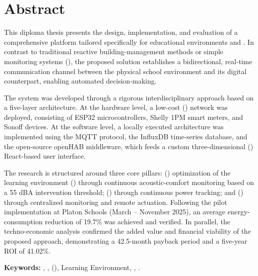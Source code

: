 \clearpage
{}
\chapter*{Abstract}

This diploma thesis presents the design, implementation, and evaluation of a comprehensive  platform tailored specifically for educational environments and . In contrast to traditional reactive building-management methods or simple monitoring systems (), the proposed solution establishes a bidirectional, real-time communication channel between the physical school environment and its digital counterpart, enabling automated decision-making.

The system was developed through a rigorous interdisciplinary approach based on a five-layer architecture. At the hardware level, a low-cost  () network was deployed, consisting of ESP32 microcontrollers, Shelly 1PM smart meters, and Sonoff devices. At the software level, a locally executed architecture was implemented using the MQTT protocol, the InfluxDB time-series database, and the open-source openHAB middleware, which feeds a custom three-dimensional () React-based user interface.

The research is structured around three core pillars: () optimization of the learning environment () through continuous acoustic-comfort monitoring based on a 55 dBA intervention threshold; ()  through continuous power tracking; and ()  through centralized monitoring and remote actuation. Following the pilot implementation at Platon Schools (March -- November 2025), an average energy-consumption reduction of 19.7\% was achieved and verified. In parallel, the techno-economic analysis confirmed the added value and financial viability of the proposed approach, demonstrating a 42.5-month payback period and a five-year ROI of 41.02\%.

\noindent\textbf{Keywords:} , ,  (), Learning Environment, , .
\clearpage
